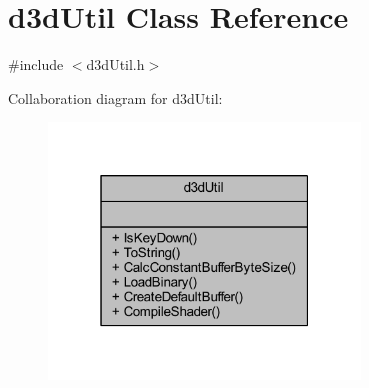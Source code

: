 \hypertarget{classd3d_util}{}\section{d3d\+Util Class Reference}
\label{classd3d_util}


{\ttfamily \#include $<$d3d\+Util.\+h$>$}



Collaboration diagram for d3d\+Util\+:\nopagebreak
\begin{figure}[H]
\begin{center}
\leavevmode
\includegraphics[width=235pt]{classd3d_util__coll__graph}
\end{center}
\end{figure}
